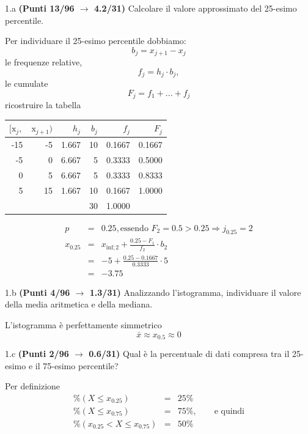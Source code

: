 \documentclass[
  11pt,
]{book}
\theoremstyle{mytheoremstyle}
\theoremstyle{mydefstyle}
\newenvironment{sol}
  {
  \begin{tcolorbox}[enhanced,breakable,arc=0.1mm,boxrule=1pt,colback=white,colframe=iblue,
  title=\bf \fontfamily{lmss}\selectfont \hspace{.5 cm} Soluzione,drop fuzzy shadow]

}{
\end{tcolorbox}
  }
\begin{document}
1.a \textbf{(Punti 13/96 \(\rightarrow\) 4.2/31)} Calcolare il valore approssimato del 25-esimo percentile.

\begin{sol}
Per individuare il 25-esimo percentile dobbiamo:
\[
b_j=x_{j+1}-x_{j}
\]
le frequenze relative,
\[
f_j=h_j\cdot b_j,
\]
le cumulate
\[
F_j=f_1+...+f_j
\]
ricostruire la tabella

\begin{table}[H]
\centering
\begin{tabular}{rrrrrr}
\toprule
$[\text{x}_j,$ & $\text{x}_{j+1})$ & $h_j$ & $b_j$ & $f_j$ & $F_j$\\
\midrule
-15 & -5 & 1.667 & 10 & 0.1667 & 0.1667\\
-5 & 0 & 6.667 & 5 & 0.3333 & 0.5000\\
0 & 5 & 6.667 & 5 & 0.3333 & 0.8333\\
5 & 15 & 1.667 & 10 & 0.1667 & 1.0000\\
 &  &  & 30 & 1.0000 & \\
\bottomrule
\end{tabular}
\end{table}

\begin{eqnarray*}
  p &=&  0.25 , \text{essendo }F_{ 2 }= 0.5  > 0.25  \Rightarrow j_{ 0.25 }= 2 \\
  x_{ 0.25 } &=& x_{\text{inf}; 2 } + \frac{ { 0.25 } - F_{ 1 }} {f_{ 2 }} \cdot b_{ 2 } \\
            &=&  -5  + \frac {{ 0.25 } -  0.1667 } { 0.3333 } \cdot  5  \\
            &=&  -3.75 
\end{eqnarray*}

\end{sol}

1.b \textbf{(Punti 4/96 \(\rightarrow\) 1.3/31)} Analizzando l'istogramma, individuare il valore della media aritmetica e della mediana.

\begin{sol}
L'istogramma è perfettamente simmetrico
\[
\bar x\approx x_{0.5}\approx 0
\]

\end{sol}

1.c \textbf{(Punti 2/96 \(\rightarrow\) 0.6/31)} Qual è la percentuale di dati compresa tra il 25-esimo e il 75-esimo percentile?

\begin{sol}
Per definizione
\begin{eqnarray*}
\%(X\le x_{0.25})&=&25\%\\
\%(X\le x_{0.75})&=&75\%, \qquad\text{e quindi}\\
\%(x_{0.25}< X\le x_{0.75})&=&50\%
\end{eqnarray*}

\end{sol}
\end{document}
